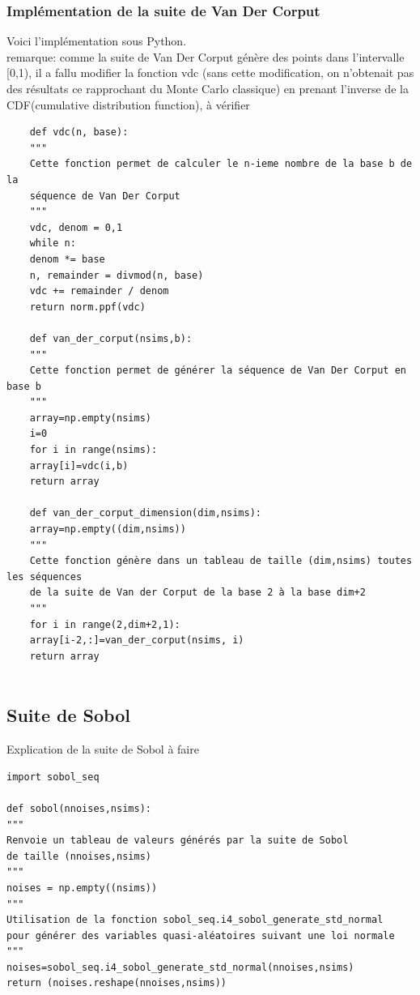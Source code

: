 \documentclass[12pt]{report}
\begin{document}
\subsubsection{Implémentation de la suite de Van Der Corput}
Voici l'implémentation sous Python.\\
remarque: comme la suite de Van Der Corput génère des points dans l'intervalle [0,1), il a fallu modifier la fonction vdc (sans cette modification, on n'obtenait pas des résultats ce rapprochant du Monte Carlo classique) en prenant l'inverse de la CDF(cumulative distribution function), à vérifier
\begin{lstlisting}
	def vdc(n, base):
	"""
	Cette fonction permet de calculer le n-ieme nombre de la base b de la 
	séquence de Van Der Corput
	"""
	vdc, denom = 0,1
	while n:
	denom *= base
	n, remainder = divmod(n, base)
	vdc += remainder / denom
	return norm.ppf(vdc)
	
	def van_der_corput(nsims,b):
	"""
	Cette fonction permet de générer la séquence de Van Der Corput en base b
	"""
	array=np.empty(nsims)
	i=0
	for i in range(nsims):
	array[i]=vdc(i,b)
	return array
	
	def van_der_corput_dimension(dim,nsims):
	array=np.empty((dim,nsims))
	"""
	Cette fonction génère dans un tableau de taille (dim,nsims) toutes les séquences
	de la suite de Van der Corput de la base 2 à la base dim+2
	"""
	for i in range(2,dim+2,1):
	array[i-2,:]=van_der_corput(nsims, i)
	return array
	
\end{lstlisting}

\subsection{Suite de Sobol}
Explication de la suite de Sobol à faire
\begin{lstlisting}
import sobol_seq

def sobol(nnoises,nsims):
"""
Renvoie un tableau de valeurs générés par la suite de Sobol
de taille (nnoises,nsims)
"""
noises = np.empty((nsims))
"""
Utilisation de la fonction sobol_seq.i4_sobol_generate_std_normal
pour générer des variables quasi-aléatoires suivant une loi normale
"""
noises=sobol_seq.i4_sobol_generate_std_normal(nnoises,nsims)
return (noises.reshape(nnoises,nsims))

\end{lstlisting}
\end{document}
